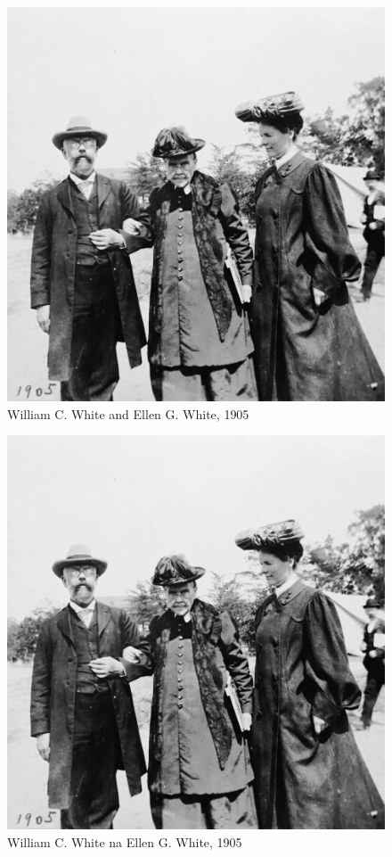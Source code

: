 \begin{figure}
    \centering
    \includegraphics[width=1\linewidth]{images/william-ellen-white-1905.jpg}
    \caption*{William C. White and Ellen G. White, 1905}
    \label{fig:w-e-white}
\end{figure}


\begin{figure}
    \centering
    \includegraphics[width=1\linewidth]{images/william-ellen-white-1905.jpg}
    \caption*{William C. White na Ellen G. White, 1905}
    \label{fig:w-e-white}
\end{figure}


